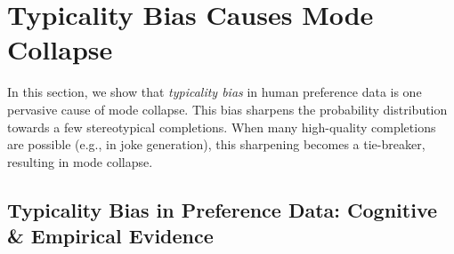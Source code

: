 
\section{Typicality Bias Causes Mode Collapse}
\label{sec:typicality}
%
%

In this section, we show that \emph{typicality bias} in human preference data is one pervasive cause of mode collapse. This bias sharpens the probability distribution towards a few stereotypical completions. When many high-quality completions are possible (e.g., in joke generation), this sharpening becomes a tie-breaker, resulting in mode collapse.





\subsection{Typicality Bias in Preference Data: Cognitive \& Empirical Evidence}
\label{sec:mc-typicality}

